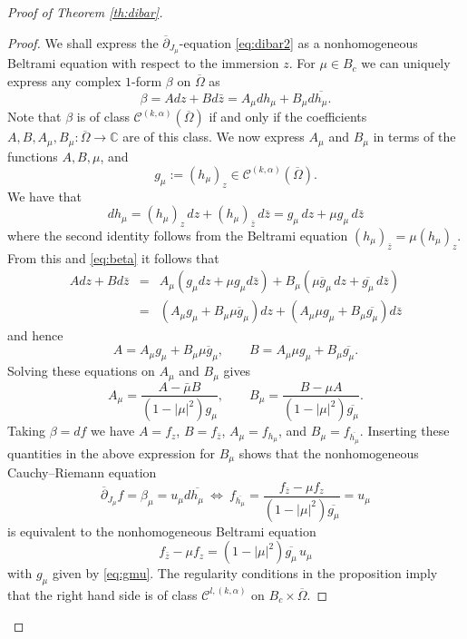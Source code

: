 \documentclass[11pt]{amsart}
\numberwithin{equation}{section}
\theoremstyle{definition}
\newcommand\Cscr{\mathscr{C}}
\newcommand\C{\mathbb{C}}
\newcommand\dibar{\overline\partial}
\begin{document}
\begin{proof}[Proof of Theorem \ref{th:dibar}]
\begin{proof}
We shall express the $\dibar_{J_\mu}$-equation \eqref{eq:dibar2} as a 
nonhomogeneous Beltrami equation with respect to the immersion $z$.
For $\mu\in B_c$ we can uniquely express any complex $1$-form 
$\beta$ on $\overline\Omega$ as 
\begin{equation}\label{eq:beta}
	\beta=A dz+Bd\bar z = A_\mu dh_\mu + B_\mu d\overline{h_\mu}.
\end{equation}
Note that $\beta$ is of class $\Cscr^{(k,\alpha)}(\overline\Omega)$
if and only if the coefficients $A,B,A_\mu,B_\mu:\overline\Omega\to\C$
are of this class. We now express $A_\mu$ and $B_\mu$ in terms of 
the functions $A,B,\mu$, and 
\begin{equation}\label{eq:gmu}	
	g_\mu := (h_\mu)_z \in \Cscr^{(k,\alpha)}(\overline\Omega).
\end{equation}
We have that 
\[
	dh_\mu = (h_\mu)_z \, dz + (h_\mu)_{\bar z} \, d\bar z
	= g_\mu\, dz + \mu g_\mu \, d\bar z
\]
where the second identity follows from the Beltrami equation
$(h_\mu)_{\bar z}=\mu (h_\mu)_z$. From this and \eqref{eq:beta} it follows that
\begin{eqnarray*}
	A dz+Bd\bar z &=& A_\mu (g_\mu dz + \mu g_\mu d\bar z)
	+ B_\mu (\overline {\mu g_\mu}\, dz + \overline{g_\mu} \, d\bar z) \\
	&=& (A_\mu g_\mu + B_\mu \overline{\mu g_\mu}) dz
	+ (A_\mu \mu g_\mu + B_\mu \overline{g_\mu}) d\bar z
\end{eqnarray*}
and hence
\[
	A = A_\mu g_\mu + B_\mu \overline{\mu g_\mu},
	\qquad
	B = A_\mu \mu g_\mu + B_\mu \overline{g_\mu}.
\]
Solving these equations on $A_\mu$ and $B_\mu$ gives
\[
	A_\mu = \frac{A  - \bar \mu B}{(1-|\mu|^2)g_\mu}, %
	\qquad 
	B_\mu = \frac{B  - \mu A}{(1-|\mu|^2) \overline{g_\mu}}.
\]
Taking $\beta=df$ we have $A=f_z$, $B=f_{\bar z}$, $A_\mu = f_{h_\mu}$, 
and $B_\mu= f_{\overline{h_\mu}}$. Inserting these quantities in 
the above expression for $B_\mu$ shows that the 
nonhomogeneous Cauchy--Riemann equation 
\[
	\dibar_{J_\mu} f = \beta_\mu = u_\mu d\overline{h_\mu} 
	\ \Longleftrightarrow \ 
	f_{\overline{h_\mu}} = 
	\frac{f_{\bar z}-\mu f_z} {(1-|\mu|^2) \overline{g_\mu}} = u_\mu
\]
is equivalent to the nonhomogeneous Beltrami equation 
\begin{equation}\label{eq:dibarmu}
	f_{\bar z}-\mu f_z = (1-|\mu|^2) \overline{g_\mu} \, u_\mu
\end{equation}
with $g_\mu$ given by \eqref{eq:gmu}. 
The regularity conditions in the proposition imply that the right hand side is of class $\Cscr^{l,(k,\alpha)}$ on $B_c\times \overline\Omega$. 

\end{proof}
\end{proof}
\end{document}
